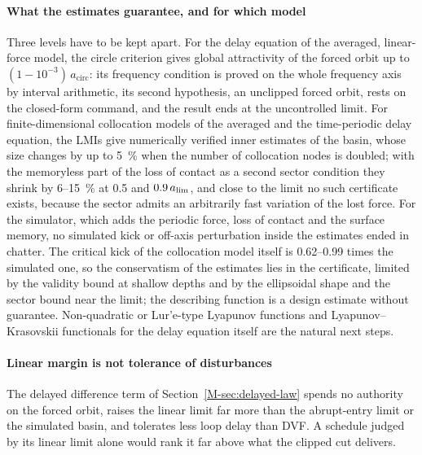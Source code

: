 \paragraph{What the estimates guarantee, and for which model}
Three levels have to be kept apart. For the delay equation of the averaged, linear-force model, the circle criterion gives global attractivity of the forced orbit up to $(1-10^{-3})\,a_{\mathrm{circ}}$: its frequency condition is proved on the whole frequency axis by interval arithmetic, its second hypothesis, an unclipped forced orbit, rests on the closed-form command, and the result ends at the uncontrolled limit. For finite-dimensional collocation models of the averaged and the time-periodic delay equation, the LMIs give numerically verified inner estimates of the basin, whose size changes by up to \SI{5}{\percent} when the number of collocation nodes is doubled; with the memoryless part of the loss of contact as a second sector condition they shrink by 6--\SI{15}{\percent} at 0.5 and $0.9\,a_{\lim}$, and close to the limit no such certificate exists, because the sector admits an arbitrarily fast variation of the lost force. For the simulator, which adds the periodic force, loss of contact and the surface memory, no simulated kick or off-axis perturbation inside the estimates ended in chatter. The critical kick of the collocation model itself is 0.62--0.99 times the simulated one, so the conservatism of the estimates lies in the certificate, limited by the validity bound at shallow depths and by the ellipsoidal shape and the sector bound near the limit; the describing function is a design estimate without guarantee. Non-quadratic or Lur'e-type Lyapunov functions \citep{hu2004lure,hu2006nonquadratic,dai2009piecewise} and Lyapunov--Krasovskii functionals for the delay equation itself \citep{papachristodoulou2009sos} are the natural next steps.

\paragraph{Linear margin is not tolerance of disturbances}
The delayed difference term of Section~\ref{M-sec:delayed-law} spends no authority on the forced orbit, raises the linear limit far more than the abrupt-entry limit or the simulated basin, and tolerates less loop delay than DVF. A schedule judged by its linear limit alone would rank it far above what the clipped cut delivers.

